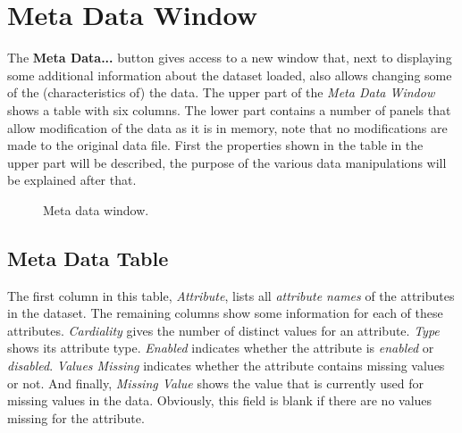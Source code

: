 \documentclass{article}
\begin{document}
\section{Meta Data Window}
\label{section:meta-data-window}
The \textbf{Meta Data...} button gives access to a new window that, next to displaying some additional information about the dataset loaded, also allows changing some of the (characteristics of) the data.
The upper part of the \emph{Meta Data Window} shows a table with six columns.
The lower part contains a number of panels that allow modification of the data as it is in memory, note that no modifications are made to the original data file.
First the properties shown in the table in the upper part will be described, the purpose of the various data manipulations will be explained after that.

\begin{figure}
\begin{center}
\centering
{}
\caption{Meta data window.}
\end{center}
\label{fig:metadatawindow}
\end{figure}



\subsection{Meta Data Table}
\label{meta-data-window:meta-data-table}
The first column in this table, \emph{Attribute}, lists all \emph{attribute names} of the attributes in the dataset.
The remaining columns show some information for each of these attributes.
\emph{Cardiality} gives the number of distinct values for an attribute.
\emph{Type} shows its attribute type.
\emph{Enabled} indicates whether the attribute is \emph{enabled} or \emph{disabled}.
\emph{Values Missing} indicates whether the attribute contains missing values or not.
And finally, \emph{Missing Value} shows the value that is currently used for missing values in the data.
Obviously, this field is blank if there are no values missing for the attribute.
\end{document}
